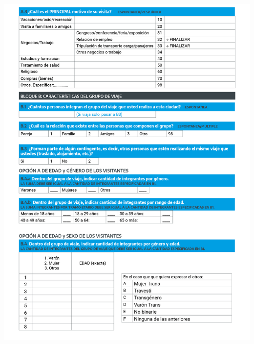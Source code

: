 \documentclass[
]{book}
\begin{document}
\begin{center}\includegraphics[width=1\linewidth]{imagenes/graf02} \end{center}
\end{document}
